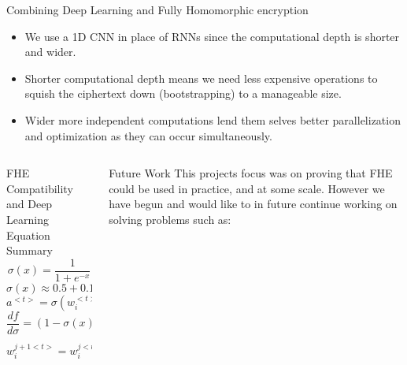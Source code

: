 \documentclass{beamer}
\begin{document}
\begin{frame}
\begin{columns}
\begin{column}{0.35\textwidth}
\begin{block}{Combining Deep Learning and Fully Homomorphic encryption}
\begin{itemize}
              \item We use a 1D CNN in place of RNNs since the computational depth is shorter and wider.
              \item Shorter computational depth means we need less expensive operations to squish the ciphertext down (bootstrapping) to a manageable size.
              \item Wider more independent computations lend them selves better parallelization and optimization as they can occur simultaneously.
          \end{itemize}
        \end{block}
      \end{column}
    \end{columns}

    \begin{columns}
      \begin{column}{0.3\textwidth}
        \begin{block}{FHE Compatibility and Deep Learning Equation Summary}
          \begin{equation}
            \label{sigmoid}
            \sigma(x) = \frac{1}{1+e^{-x}}
          \end{equation}
          \begin{equation}
            \label{sigmoid_approx}
            \sigma(x) \approx 0.5 + 0.197x + -0.004x^3
          \end{equation}
          \begin{equation}
            \label{cnn_activation}
            a^{<t>}=\sigma(w_{i}^{<t>}x^{<t>}+b_i^{<t>})
          \end{equation}
          \begin{equation}
            \label{gradient}
            \frac{df}{d\sigma} = (1-\sigma(x)) * \sigma(x)
          \end{equation}
          \begin{equation}
            \label{weight_update}
            w_i^{j+1<t>} = w_i^{j<t>} - (l * \frac{df}{dw_i^{j<t>}})
          \end{equation}
        \end{block}
      \end{column}
      \begin{column}{0.3\textwidth}
        \begin{block}{Future Work}
          This projects focus was on proving that FHE could be used in practice, and at some scale. However we have begun and would like to in future continue working on  solving problems such as:

\end{block}
\end{column}
\end{columns}
\end{frame}
\end{document}

